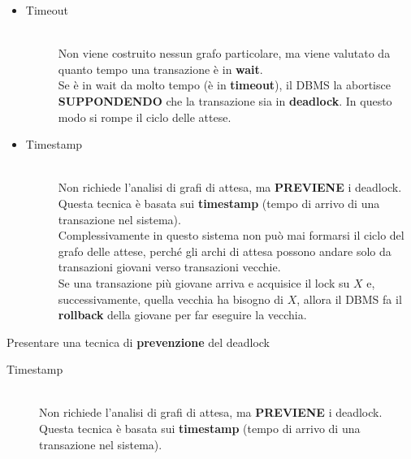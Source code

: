 \documentclass{exam}
\begin{document}
\begin{questions}
\begin{solution}
\begin{itemize}
            \item 
                \begin{description}
                    \item[Timeout] \hfill \\ Non viene costruito nessun grafo particolare, ma viene valutato da quanto tempo una transazione è in \textbf{wait}.\\
                    Se è in wait da molto tempo (è in \textbf{timeout}), il DBMS la abortisce \textbf{SUPPONDENDO} che la transazione sia in \textbf{deadlock}. In questo modo si rompe il ciclo delle attese. 
                \end{description}
            \item 
                \begin{description}
                    \item[Timestamp] \hfill \\ Non richiede l'analisi di grafi di attesa, ma \textbf{PREVIENE} i deadlock. Questa tecnica è basata sui \textbf{timestamp} (tempo di arrivo di una transazione nel sistema). \\
                    Complessivamente in questo sistema non può mai formarsi il ciclo del grafo delle attese, perché gli archi di attesa possono andare solo da transazioni giovani verso transazioni vecchie.\\
                    Se una transazione più giovane arriva e acquisice il lock su $X$ e, successivamente, quella vecchia ha bisogno di $X$, allora il DBMS fa il \textbf{rollback} della giovane per far eseguire la vecchia.
                \end{description}
        \end{itemize}
    \end{solution}
    \question Presentare una tecnica di \textbf{prevenzione} del deadlock
    \begin{solution}
        \begin{description}
            \item[Timestamp] \hfill \\ Non richiede l'analisi di grafi di attesa, ma \textbf{PREVIENE} i deadlock. Questa tecnica è basata sui \textbf{timestamp} (tempo di arrivo di una transazione nel sistema). \\

\end{description}
\end{solution}
\end{questions}
\end{document}

